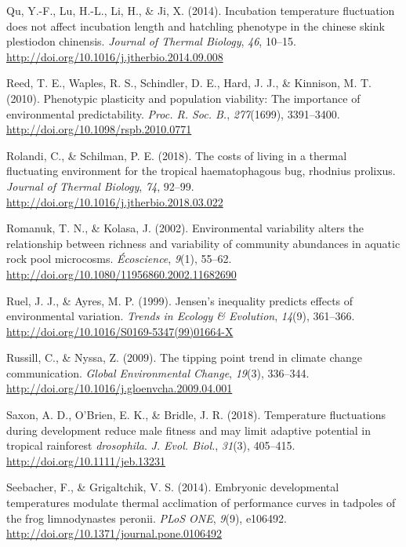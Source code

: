 \documentclass[12pt,twoside]{reedthesis}
\begin{document}
\leavevmode\hypertarget{ref-qu_incubation_2014}{}%
Qu, Y.-F., Lu, H.-L., Li, H., \& Ji, X. (2014). Incubation temperature fluctuation does not affect incubation length and hatchling phenotype in the chinese skink plestiodon chinensis. \emph{Journal of Thermal Biology}, \emph{46}, 10--15. \url{http://doi.org/10.1016/j.jtherbio.2014.09.008}

\leavevmode\hypertarget{ref-reed_phenotypic_2010}{}%
Reed, T. E., Waples, R. S., Schindler, D. E., Hard, J. J., \& Kinnison, M. T. (2010). Phenotypic plasticity and population viability: The importance of environmental predictability. \emph{Proc. R. Soc. B.}, \emph{277}(1699), 3391--3400. \url{http://doi.org/10.1098/rspb.2010.0771}

\leavevmode\hypertarget{ref-rolandi_costs_2018}{}%
Rolandi, C., \& Schilman, P. E. (2018). The costs of living in a thermal fluctuating environment for the tropical haematophagous bug, rhodnius prolixus. \emph{Journal of Thermal Biology}, \emph{74}, 92--99. \url{http://doi.org/10.1016/j.jtherbio.2018.03.022}

\leavevmode\hypertarget{ref-romanuk_environmental_2002}{}%
Romanuk, T. N., \& Kolasa, J. (2002). Environmental variability alters the relationship between richness and variability of community abundances in aquatic rock pool microcosms. \emph{Écoscience}, \emph{9}(1), 55--62. \url{http://doi.org/10.1080/11956860.2002.11682690}

\leavevmode\hypertarget{ref-ruel_jensens_1999}{}%
Ruel, J. J., \& Ayres, M. P. (1999). Jensen's inequality predicts effects of environmental variation. \emph{Trends in Ecology \& Evolution}, \emph{14}(9), 361--366. \url{http://doi.org/10.1016/S0169-5347(99)01664-X}

\leavevmode\hypertarget{ref-russill_tipping_2009}{}%
Russill, C., \& Nyssa, Z. (2009). The tipping point trend in climate change communication. \emph{Global Environmental Change}, \emph{19}(3), 336--344. \url{http://doi.org/10.1016/j.gloenvcha.2009.04.001}

\leavevmode\hypertarget{ref-saxon_temperature_2018-1}{}%
Saxon, A. D., O'Brien, E. K., \& Bridle, J. R. (2018). Temperature fluctuations during development reduce male fitness and may limit adaptive potential in tropical rainforest \emph{drosophila}. \emph{J. Evol. Biol.}, \emph{31}(3), 405--415. \url{http://doi.org/10.1111/jeb.13231}

\leavevmode\hypertarget{ref-seebacher_embryonic_2014}{}%
Seebacher, F., \& Grigaltchik, V. S. (2014). Embryonic developmental temperatures modulate thermal acclimation of performance curves in tadpoles of the frog limnodynastes peronii. \emph{PLoS ONE}, \emph{9}(9), e106492. \url{http://doi.org/10.1371/journal.pone.0106492}
\end{document}
